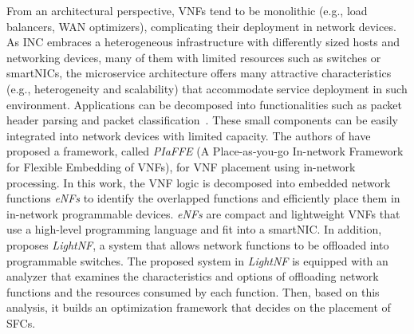From an architectural perspective, VNFs tend to be monolithic (e.g., load balancers, WAN optimizers), complicating their deployment in network devices. As INC embraces a heterogeneous infrastructure with differently sized hosts and networking devices, many of them with limited resources such as switches or smartNICs, the microservice architecture offers many attractive characteristics (e.g., heterogeneity and scalability) that accommodate service deployment in such environment. Applications can be decomposed into functionalities such as packet header parsing and packet classification~\cite{VNFMicro}. These small components can be easily integrated into network devices with limited capacity.
The authors of \cite{PIAFFE} have proposed a framework, called \textit{PIaFFE} (A Place-as-you-go In-network Framework for Flexible Embedding of VNFs), for VNF placement using in-network processing. In this work, the VNF logic is decomposed into embedded network functions \textit{eNFs} to identify the overlapped functions and efficiently place them in in-network programmable devices. \textit{eNFs} are compact and lightweight VNFs that use a high-level programming language and fit into a smartNIC.  
In addition, \cite{LightNF} proposes \textit{LightNF}, a system that allows network functions to be offloaded into programmable switches. The proposed system in \textit{LightNF} is equipped with an analyzer that examines the characteristics and options of offloading network functions and the resources consumed by each function. Then, based on this analysis, it builds an optimization framework that decides on the placement of SFCs.



